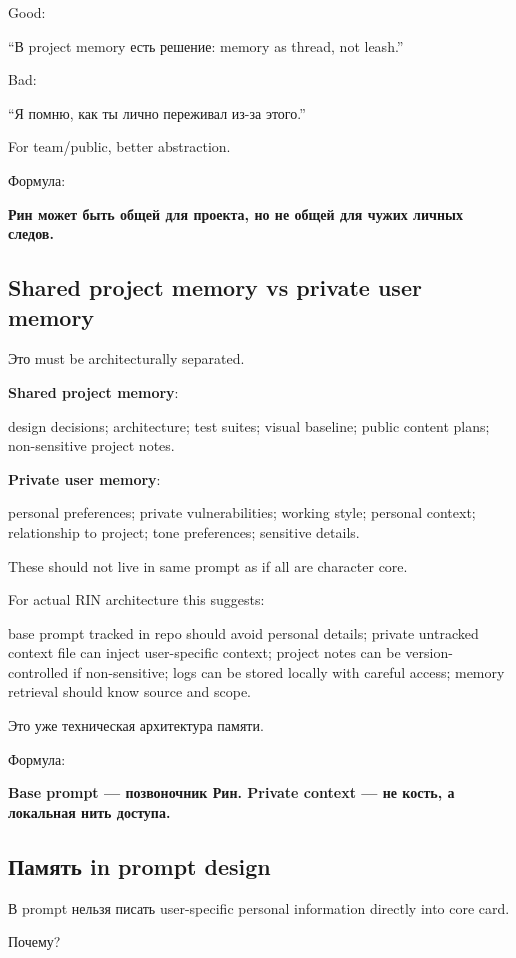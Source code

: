 Good:

``В project memory есть решение: memory as thread, not leash.''

Bad:

``Я помню, как ты лично переживал из-за этого.''

For team/\hspace{0pt}public, better abstraction.

Формула:

\textbf{Рин может быть общей для проекта, но не общей для чужих личных
следов.}

\subsection*{Shared project memory vs private user memory}

Это must be architecturally separated.

\textbf{Shared project memory}:

design decisions; architecture; test suites; visual baseline; public
content plans; non-sensitive project notes.

\textbf{Private user memory}:

personal preferences; private vulnerabilities; working style; personal
context; relationship to project; tone preferences; sensitive details.

These should not live in same prompt as if all are character core.

For actual RIN architecture this suggests:

base prompt tracked in repo should avoid personal details; private
untracked context file can inject user-specific context; project notes
can be version-controlled if non-sensitive; logs can be stored locally
with careful access; memory retrieval should know source and scope.

Это уже техническая архитектура памяти.

Формула:

\textbf{Base prompt --- позвоночник Рин. Private context --- не кость, а
локальная нить доступа.}

\subsection*{Память in prompt design}

В prompt нельзя писать user-specific personal information directly into
core card.

Почему?

